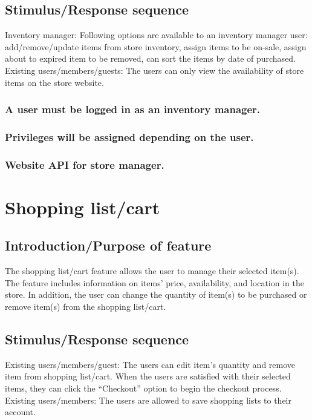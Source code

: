 \documentclass{scrreprt}
\begin{document}
\subsection{Stimulus/Response sequence}
Inventory manager:
Following options are available to an inventory manager user: add/remove/update items from store inventory, assign items to be on-sale, assign about to expired item to be removed, can sort the items by date of purchased.
Existing users/members/guests:
The users can only view the availability of store items on the store website.

\subsubsection[]{\normalfont A user must be logged in as an inventory manager.}
\subsubsection[]{\normalfont Privileges will be assigned depending on the user.}
\subsubsection[]{\normalfont Website API for store manager.}


\section{Shopping list/cart}
\subsection{Introduction/Purpose of feature}
The shopping list/cart feature allows the user to manage their selected item(s). The feature includes information on items’ price, availability, and location in the store. In addition, the user can change the quantity of item(s) to be purchased or remove item(s) from the shopping list/cart.

\subsection{Stimulus/Response sequence}
Existing users/members/guest:
The users can edit item’s quantity and remove item from shopping list/cart. When the users are satisfied with their selected items, they can click the “Checkout” option to begin the checkout process. 
Existing users/members:
The users are allowed to save shopping lists to their account.
\end{document}
